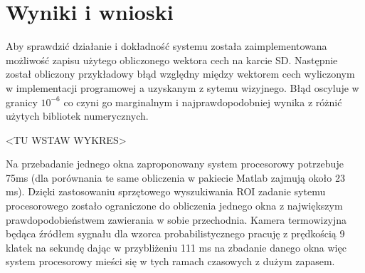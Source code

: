 \chapter{Wyniki i wnioski}

Aby sprawdzić działanie i dokładność systemu została zaimplementowana możliwość zapisu użytego obliczonego wektora cech na karcie SD. Następnie został obliczony przykładowy błąd względny między wektorem cech wyliczonym w implementacji programowej a uzyskanym z sytemu wizyjnego. Błąd oscyluje w granicy \(10^{-6}\) co czyni go marginalnym i najprawdopodobniej wynika z różnić użytych bibliotek numerycznych.

<TU WSTAW WYKRES>

Na przebadanie jednego okna zaproponowany system procesorowy potrzebuje 75ms  (dla porównania te same obliczenia w pakiecie Matlab zajmują około 23 ms). Dzięki zastosowaniu sprzętowego wyszukiwania ROI zadanie sytemu procesorowego zostało ograniczone do obliczenia jednego okna z największym prawdopodobieństwem zawierania w sobie przechodnia. Kamera termowizyjna będąca źródłem sygnału dla wzorca probabilistycznego pracuję z prędkością 9 klatek na sekundę dając w przybliżeniu 111 ms na zbadanie danego okna więc system procesorowy mieści się w tych ramach czasowych z dużym zapasem. 
